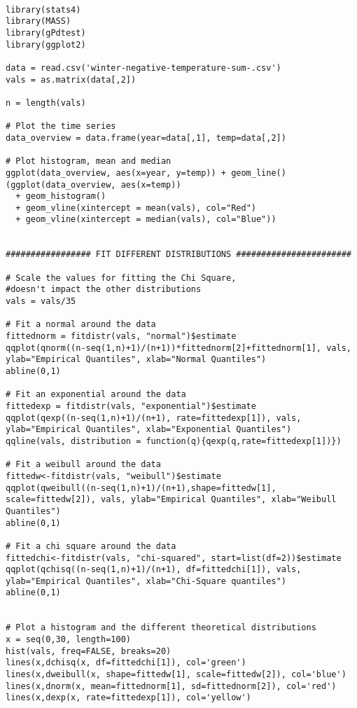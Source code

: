 \begin{lstlisting}

library(stats4)
library(MASS)
library(gPdtest)
library(ggplot2)

data = read.csv('winter-negative-temperature-sum-.csv')
vals = as.matrix(data[,2])

n = length(vals)

# Plot the time series
data_overview = data.frame(year=data[,1], temp=data[,2])

# Plot histogram, mean and median
ggplot(data_overview, aes(x=year, y=temp)) + geom_line()
(ggplot(data_overview, aes(x=temp)) 
  + geom_histogram()
  + geom_vline(xintercept = mean(vals), col="Red")
  + geom_vline(xintercept = median(vals), col="Blue"))


################# FIT DIFFERENT DISTRIBUTIONS #######################

# Scale the values for fitting the Chi Square,
#doesn't impact the other distributions
vals = vals/35

# Fit a normal around the data
fittednorm = fitdistr(vals, "normal")$estimate
qqplot(qnorm((n-seq(1,n)+1)/(n+1))*fittednorm[2]+fittednorm[1], vals,
ylab="Empirical Quantiles", xlab="Normal Quantiles")
abline(0,1)

# Fit an exponential around the data
fittedexp = fitdistr(vals, "exponential")$estimate
qqplot(qexp((n-seq(1,n)+1)/(n+1), rate=fittedexp[1]), vals,
ylab="Empirical Quantiles", xlab="Exponential Quantiles")
qqline(vals, distribution = function(q){qexp(q,rate=fittedexp[1])})

# Fit a weibull around the data
fittedw<-fitdistr(vals, "weibull")$estimate
qqplot(qweibull((n-seq(1,n)+1)/(n+1),shape=fittedw[1], scale=fittedw[2]), vals, ylab="Empirical Quantiles", xlab="Weibull Quantiles")
abline(0,1)

# Fit a chi square around the data
fittedchi<-fitdistr(vals, "chi-squared", start=list(df=2))$estimate
qqplot(qchisq((n-seq(1,n)+1)/(n+1), df=fittedchi[1]), vals, ylab="Empirical Quantiles", xlab="Chi-Square quantiles")
abline(0,1)


# Plot a histogram and the different theoretical distributions
x = seq(0,30, length=100)
hist(vals, freq=FALSE, breaks=20)
lines(x,dchisq(x, df=fittedchi[1]), col='green')
lines(x,dweibull(x, shape=fittedw[1], scale=fittedw[2]), col='blue')
lines(x,dnorm(x, mean=fittednorm[1], sd=fittednorm[2]), col='red')
lines(x,dexp(x, rate=fittedexp[1]), col='yellow')

\end{lstlisting}
